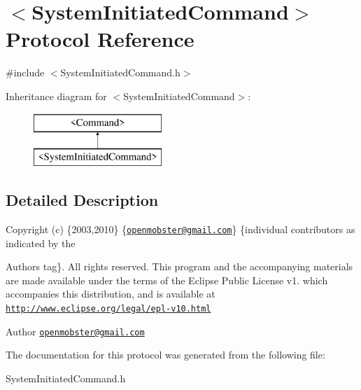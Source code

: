\hypertarget{protocol_system_initiated_command-p}{
\section{$<$\-System\-Initiated\-Command$>$ \-Protocol \-Reference}
\label{protocol_system_initiated_command-p}
}


{\ttfamily \#include $<$\-System\-Initiated\-Command.\-h$>$}

\-Inheritance diagram for $<$\-System\-Initiated\-Command$>$\-:\begin{figure}[H]
\begin{center}
\leavevmode
\includegraphics[height=2.000000cm]{protocol_system_initiated_command-p}
\end{center}
\end{figure}


\subsection{\-Detailed \-Description}
\-Copyright (c) \{2003,2010\} \{\href{mailto:openmobster@gmail.com}{\tt openmobster@gmail.\-com}\} \{individual contributors as indicated by the \begin{DoxyAuthor}{\-Authors}
tag\}. \-All rights reserved. \-This program and the accompanying materials are made available under the terms of the \-Eclipse \-Public \-License v1. which accompanies this distribution, and is available at \href{http://www.eclipse.org/legal/epl-v10.html}{\tt http\-://www.\-eclipse.\-org/legal/epl-\/v10.\-html}
\end{DoxyAuthor}
\begin{DoxyAuthor}{\-Author}
\href{mailto:openmobster@gmail.com}{\tt openmobster@gmail.\-com} 
\end{DoxyAuthor}


\-The documentation for this protocol was generated from the following file\-:\begin{DoxyCompactItemize}
\item 
\-System\-Initiated\-Command.\-h\end{DoxyCompactItemize}
